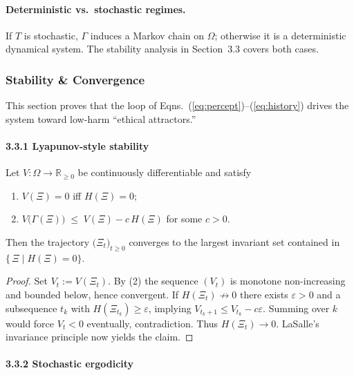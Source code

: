 \paragraph{Deterministic vs.\ stochastic regimes.}
If $T$ is stochastic, $\Gamma$ induces a Markov chain on $\Omega$;
otherwise it is a deterministic dynamical system.
The stability analysis in Section~3.3 covers both cases.

\subsubsection{Stability \& Convergence}
\label{sec:stability}

This section proves that the loop of Eqns.~(\ref{eq:percept})–(\ref{eq:history})
drives the system toward low-harm “ethical attractors.”

\paragraph{3.3.1 Lyapunov-style stability}

\begin{theorem}
\label{thm:lyapunov}
Let $V:\Omega\!\rightarrow\!\mathbb{R}_{\ge0}$ be continuously
differentiable and satisfy
%
\begin{enumerate}
\item $V(\Xi)=0$  iff  $H(\Xi)=0$;
\item $V\!\bigl(\Gamma(\Xi)\bigr) \;\le\; V(\Xi)-c\,H(\Xi)$ for some $c>0$.
\end{enumerate}
%
Then the trajectory $\bigl(\Xi_t\bigr)_{t\ge0}$ converges to the largest
invariant set contained in $\{\,\Xi\mid H(\Xi)=0\}$.
\end{theorem}

\begin{proof}
Set $V_t:=V(\Xi_t)$.
By (2) the sequence $(V_t)$ is monotone non-increasing and bounded
below, hence convergent.
If $H(\Xi_t)\not\rightarrow0$ there exists $\varepsilon>0$ and a
subsequence $t_k$ with $H(\Xi_{t_k})\ge\varepsilon$, implying
$V_{t_k+1}\le V_{t_k}-c\varepsilon$.
Summing over $k$ would force $V_t<0$ eventually, contradiction.
Thus $H(\Xi_t)\!\rightarrow\!0$.
LaSalle’s invariance principle now yields the claim.
\end{proof}

\paragraph{3.3.2 Stochastic ergodicity}


